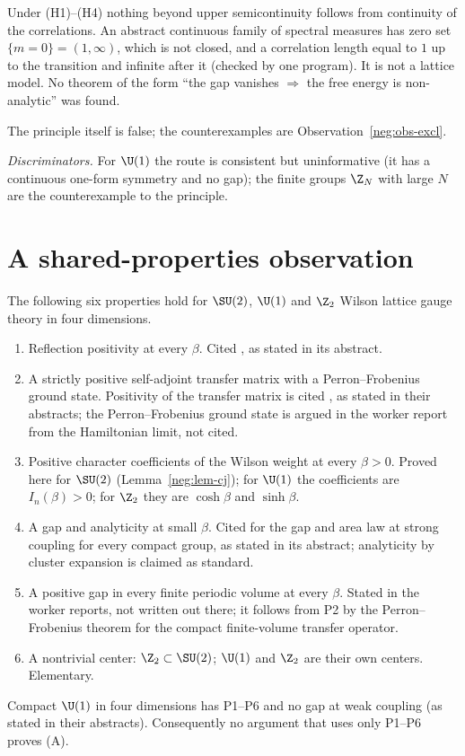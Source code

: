 \begin{observation}\label{neg:obs-usc}
Under \textup{(H1)--(H4)} nothing beyond upper semicontinuity follows from continuity of the
correlations. An abstract continuous family of spectral measures has zero set
$\{m=0\}=(1,\infty)$, which is not closed, and a correlation length equal to $1$ up to the
transition and infinite after it (checked by one program). It is not a lattice model. No theorem
of the form ``the gap vanishes $\Rightarrow$ the free energy is non-analytic'' was found.
\end{observation}

The principle itself is false; the counterexamples are Observation~\ref{neg:obs-excl}.

\emph{Discriminators.} For $\U(1)$ the route is consistent but uninformative (it has a continuous
one-form symmetry and no gap); the finite groups $\Z_N$ with large $N$ are the counterexample to
the principle.

\section{A shared-properties observation}\label{sec:shared}

\begin{observation}\label{neg:obs-shared}
The following six properties hold for $\SU(2)$, $\U(1)$ and $\Z_2$ Wilson lattice gauge theory
in four dimensions.
\begin{enumerate}
\item[P1] Reflection positivity at every $\beta$. Cited \cite{OS78}, as stated in its abstract.
\item[P2] A strictly positive self-adjoint transfer matrix with a Perron--Frobenius ground
state. Positivity of the transfer matrix is cited \cite{OS78,Lu77}, as stated in their
abstracts; the Perron--Frobenius ground state is argued in the worker report from the
Hamiltonian limit, not cited.
\item[P3] Positive character coefficients of the Wilson weight at every $\beta>0$. Proved here
for $\SU(2)$ (Lemma~\ref{neg:lem-cj}); for $\U(1)$ the coefficients are $I_n(\beta)>0$; for
$\Z_2$ they are $\cosh\beta$ and $\sinh\beta$.
\item[P4] A gap and analyticity at small $\beta$. Cited \cite{OS78} for the gap and area law at
strong coupling for every compact group, as stated in its abstract; analyticity by cluster
expansion is claimed as standard.
\item[P5] A positive gap in every finite periodic volume at every $\beta$. Stated in the worker
reports, not written out there; it follows from P2 by the Perron--Frobenius theorem for the
compact finite-volume transfer operator.
\item[P6] A nontrivial center: $\Z_2\subset\SU(2)$; $\U(1)$ and $\Z_2$ are their own centers.
Elementary.
\end{enumerate}
Compact $\U(1)$ in four dimensions has P1--P6 and no gap at weak coupling \cite{Guth80,FS82}
(as stated in their abstracts). Consequently no argument that uses only P1--P6 proves (A).
\end{observation}


